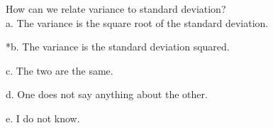 
How can we relate variance to standard deviation?\\

a. The variance is the square root of the standard deviation.

*b. The variance is the standard deviation squared.

c. The two are the same.

d. One does not say anything about the other.

e. I do not know.\\
